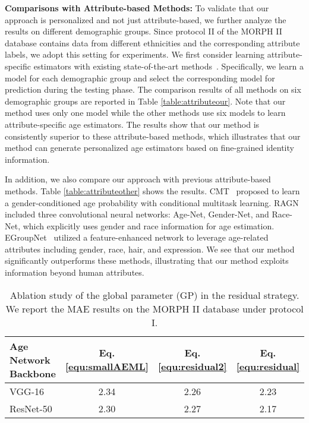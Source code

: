 \documentclass[journal,twoside]{IEEEtran}
\begin{document}
\textbf{Comparisons with Attribute-based Methods:} To validate that our approach is personalized and not just attribute-based, we further analyze the results on different demographic groups. Since protocol II of the MORPH II database contains data from different ethnicities and the corresponding attribute labels, we adopt this setting for experiments. We first consider learning attribute-specific estimators with existing state-of-the-art methods~\cite{rothe2018deep,pan2018mean}. Specifically, we learn a model for each demographic group and select the corresponding model for prediction during the testing phase. The comparison results of all methods on six demographic groups are reported in Table \ref{table:attributeour}. Note that our method uses only one model while the other methods use six models to learn attribute-specific age estimators. The results show that our method is consistently superior to these attribute-based methods, which illustrates that our method can generate personalized age estimators based on  fine-grained identity information.

In addition, we also compare our approach with previous attribute-based methods. Table \ref{table:attributeother} shows the results. CMT~\cite{yoo2018deep} proposed to learn a gender-conditioned age probability with conditional multitask learning. RAGN~\cite{duan2017ensemble} included three convolutional neural networks: Age-Net, Gender-Net, and Race-Net, which explicitly uses gender and race information for age estimation. EGroupNet~\cite{duan2020egroupnet} utilized a feature-enhanced network to leverage age-related attributes including gender, race, hair, and expression. We see that our method significantly outperforms these methods, illustrating that our method exploits information beyond human attributes.
 







\begin{table}[t]
\caption{Ablation study of the global parameter (GP) in the residual strategy. We report the MAE results on the MORPH II database under protocol I.}
\renewcommand\tabcolsep{10pt}
\centering
\begin{tabular}{lccc}
\toprule
Age Network Backbone  &  Eq. \eqref{equ:smallAEML}  & Eq. \eqref{equ:residual2} & Eq. \eqref{equ:residual}  \\
\midrule
VGG-16 & 2.34 &  2.26 & 2.23   \\
ResNet-50  & 2.30 & 2.27 & 2.17 \\
\bottomrule
\end{tabular}
\label{table:gp}
\end{table}
\end{document}
